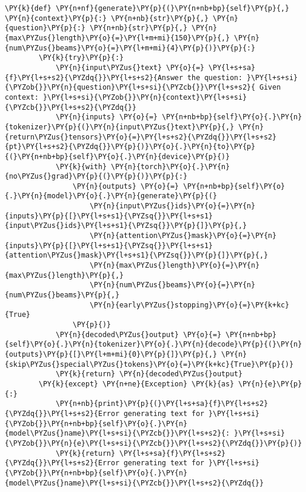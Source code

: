 \documentclass[11pt]{wseas}
\begin{document}
\begin{tcolorbox}[breakable, size=fbox, boxrule=1pt, pad at break*=1mm,colback=cellbackground, colframe=cellborder]
\begin{Verbatim}[commandchars=\\\{\}]
    \PY{k}{def} \PY{n+nf}{generate}\PY{p}{(}\PY{n+nb+bp}{self}\PY{p}{,} \PY{n}{context}\PY{p}{:} \PY{n+nb}{str}\PY{p}{,} \PY{n}{question}\PY{p}{:} \PY{n+nb}{str}\PY{p}{,} \PY{n}{max\PYZus{}length}\PY{o}{=}\PY{l+m+mi}{150}\PY{p}{,} \PY{n}{num\PYZus{}beams}\PY{o}{=}\PY{l+m+mi}{4}\PY{p}{)}\PY{p}{:}
        \PY{k}{try}\PY{p}{:}
            \PY{n}{input\PYZus{}text} \PY{o}{=} \PY{l+s+sa}{f}\PY{l+s+s2}{\PYZdq{}}\PY{l+s+s2}{Answer the question: }\PY{l+s+si}{\PYZob{}}\PY{n}{question}\PY{l+s+si}{\PYZcb{}}\PY{l+s+s2}{ Given context: }\PY{l+s+si}{\PYZob{}}\PY{n}{context}\PY{l+s+si}{\PYZcb{}}\PY{l+s+s2}{\PYZdq{}}
            \PY{n}{inputs} \PY{o}{=} \PY{n+nb+bp}{self}\PY{o}{.}\PY{n}{tokenizer}\PY{p}{(}\PY{n}{input\PYZus{}text}\PY{p}{,} \PY{n}{return\PYZus{}tensors}\PY{o}{=}\PY{l+s+s2}{\PYZdq{}}\PY{l+s+s2}{pt}\PY{l+s+s2}{\PYZdq{}}\PY{p}{)}\PY{o}{.}\PY{n}{to}\PY{p}{(}\PY{n+nb+bp}{self}\PY{o}{.}\PY{n}{device}\PY{p}{)}
            \PY{k}{with} \PY{n}{torch}\PY{o}{.}\PY{n}{no\PYZus{}grad}\PY{p}{(}\PY{p}{)}\PY{p}{:}
                \PY{n}{outputs} \PY{o}{=} \PY{n+nb+bp}{self}\PY{o}{.}\PY{n}{model}\PY{o}{.}\PY{n}{generate}\PY{p}{(}
                    \PY{n}{input\PYZus{}ids}\PY{o}{=}\PY{n}{inputs}\PY{p}{[}\PY{l+s+s1}{\PYZsq{}}\PY{l+s+s1}{input\PYZus{}ids}\PY{l+s+s1}{\PYZsq{}}\PY{p}{]}\PY{p}{,}
                    \PY{n}{attention\PYZus{}mask}\PY{o}{=}\PY{n}{inputs}\PY{p}{[}\PY{l+s+s1}{\PYZsq{}}\PY{l+s+s1}{attention\PYZus{}mask}\PY{l+s+s1}{\PYZsq{}}\PY{p}{]}\PY{p}{,}
                    \PY{n}{max\PYZus{}length}\PY{o}{=}\PY{n}{max\PYZus{}length}\PY{p}{,}
                    \PY{n}{num\PYZus{}beams}\PY{o}{=}\PY{n}{num\PYZus{}beams}\PY{p}{,}
                    \PY{n}{early\PYZus{}stopping}\PY{o}{=}\PY{k+kc}{True}
                \PY{p}{)}
            \PY{n}{decoded\PYZus{}output} \PY{o}{=} \PY{n+nb+bp}{self}\PY{o}{.}\PY{n}{tokenizer}\PY{o}{.}\PY{n}{decode}\PY{p}{(}\PY{n}{outputs}\PY{p}{[}\PY{l+m+mi}{0}\PY{p}{]}\PY{p}{,} \PY{n}{skip\PYZus{}special\PYZus{}tokens}\PY{o}{=}\PY{k+kc}{True}\PY{p}{)}
            \PY{k}{return} \PY{n}{decoded\PYZus{}output}
        \PY{k}{except} \PY{n+ne}{Exception} \PY{k}{as} \PY{n}{e}\PY{p}{:}
            \PY{n+nb}{print}\PY{p}{(}\PY{l+s+sa}{f}\PY{l+s+s2}{\PYZdq{}}\PY{l+s+s2}{Error generating text for }\PY{l+s+si}{\PYZob{}}\PY{n+nb+bp}{self}\PY{o}{.}\PY{n}{model\PYZus{}name}\PY{l+s+si}{\PYZcb{}}\PY{l+s+s2}{: }\PY{l+s+si}{\PYZob{}}\PY{n}{e}\PY{l+s+si}{\PYZcb{}}\PY{l+s+s2}{\PYZdq{}}\PY{p}{)}
            \PY{k}{return} \PY{l+s+sa}{f}\PY{l+s+s2}{\PYZdq{}}\PY{l+s+s2}{Error generating text for }\PY{l+s+si}{\PYZob{}}\PY{n+nb+bp}{self}\PY{o}{.}\PY{n}{model\PYZus{}name}\PY{l+s+si}{\PYZcb{}}\PY{l+s+s2}{\PYZdq{}}
        

\end{Verbatim}
\end{tcolorbox}
\end{document}
